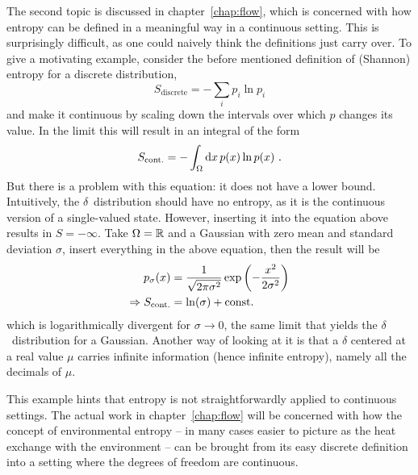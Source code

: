 The second topic is discussed in chapter~\ref{chap:flow}, which is concerned with how entropy can be defined in a meaningful way in a continuous setting. This is surprisingly difficult, as one could naively think the definitions just carry over. To give a motivating example, consider the before mentioned definition of (Shannon) entropy for a discrete distribution,
%
\begin{equation}
	S_\text{discrete} = -\sum_ip_i\ln p_i
\end{equation}
%
and make it continuous by scaling down the intervals over which \(p\) changes its value. In the limit this will result in an integral of the form
%
\begin{equation}
	S_\text{cont.} = -\int_\Omega\mathrm{d} x\,p(x)\ln p(x) ~.
\end{equation}
%
But there is a problem with this equation: it does not have a lower bound. Intuitively, the \(\delta\)~distribution should have no entropy, as it is the continuous version of a single-valued state. However, inserting it into the equation above results in \(S = -\infty\). Take \(\Omega = \mathbb{R}\) and a Gaussian with zero mean and standard deviation \(\sigma\), insert everything in the above equation, then the result will be
%
\begin{align}
	p_\sigma(x) &= \frac1{\sqrt{2\pi\sigma^2}} \operatorname{exp}\left(-\frac{x^2}{2\sigma^2}\right) \\
	\Rightarrow S_\text{cont.} &= \ln(\sigma) + \mathrm{const.}
\end{align}
%
which is logarithmically divergent for \(\sigma\to0\), the same limit that yields the \(\delta\)~distribution for a Gaussian. Another way of looking at it is that a \(\delta\) centered at a real value \(\mu\) carries infinite information (hence infinite entropy), namely all the decimals of \(\mu\).

This example hints that entropy is not straightforwardly applied to continuous settings. The actual work in chapter~\ref{chap:flow} will be concerned with how the concept of environmental entropy -- in many cases easier to picture as the heat exchange with the environment -- can be brought from its easy discrete definition into a setting where the degrees of freedom are continuous.




